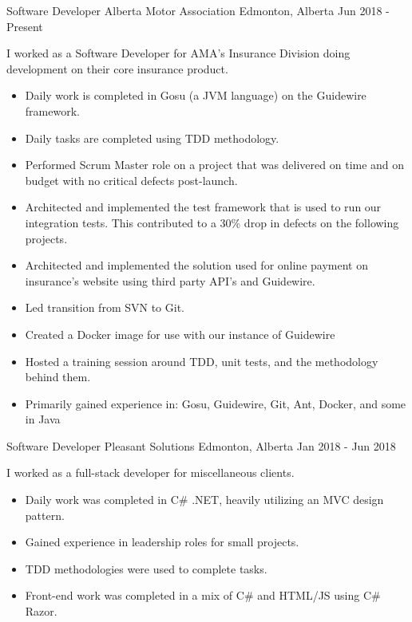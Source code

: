 
\begin{cventries}
    \cventry
        {Software Developer}
        {Alberta Motor Association}
        {Edmonton, Alberta}
        {Jun 2018 - Present}
        {
            I worked as a Software Developer for AMA's Insurance Division doing development on their core insurance product.
            \begin{itemize}
                \item Daily work is completed in Gosu (a JVM language) on the Guidewire framework.
                \item Daily tasks are completed using TDD methodology.
                \item Performed Scrum Master role on a project that was delivered on time and on budget with no critical defects post-launch.
                \item Architected and implemented the test framework that is used to run our integration tests.  This contributed to a 30\% drop in defects on the following projects.
                \item Architected and implemented the solution used for online payment on insurance's website using third party API's and Guidewire.
                \item Led transition from SVN to Git.
                \item Created a Docker image for use with our instance of Guidewire
                \item Hosted a training session around TDD, unit tests, and the methodology behind them.
                \item Primarily gained experience in: Gosu, Guidewire, Git, Ant, Docker, and some in Java
            \end{itemize}
        }
    \cventry
        {Software Developer}
        {Pleasant Solutions}
        {Edmonton, Alberta}
        {Jan 2018 - Jun 2018}
        {
            I worked as a full-stack developer for miscellaneous clients.
            \begin{itemize}
                \item Daily work was completed in C\# .NET, heavily utilizing an MVC design pattern.
                \item Gained experience in leadership roles for small projects.
                \item TDD methodologies were used to complete tasks.
                \item Front-end work was completed in a mix of C\# and HTML/JS using C\# Razor.

\end{itemize}}
\end{cventries}
